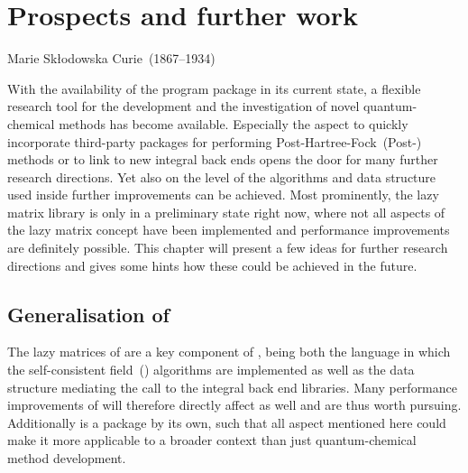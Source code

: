 \chapter{Prospects and further work}
\label{ch:Prospects}
{Marie Skłodowska Curie~(1867--1934)}


\noindent
With the availability of the \molsturm program package in its
current state, a flexible research tool
for the development and the investigation of novel quantum-chemical methods
has become available.
Especially the aspect to quickly incorporate third-party packages
for performing Post-Hartree-Fock~(Post-\HF) methods
or to link to new integral back ends
opens the door for many further research directions.
Yet also on the level of the algorithms and data structure used
inside \molsturm further improvements can be achieved.
Most prominently, the \lazyten lazy matrix library is only
in a preliminary state right now,
where not all aspects of the lazy matrix concept have been implemented
and performance improvements are definitely possible.
This chapter will present a few ideas for further research directions
and gives some hints how these could be achieved in the future.

\section{Generalisation of \lazyten}
\label{sec:GeneraliseLazyten}
The lazy matrices of \lazyten are a key component of \molsturm,
being both the language in which the self-consistent field~(\SCF)
algorithms are implemented
as well as the data structure
mediating the call to the integral back end libraries.
Many performance improvements of \lazyten will therefore
directly affect \molsturm as well and are thus worth pursuing.
Additionally \lazyten is a package by its own,
such that all aspect mentioned here could make it more
applicable to a broader context than just
quantum-chemical method development.

